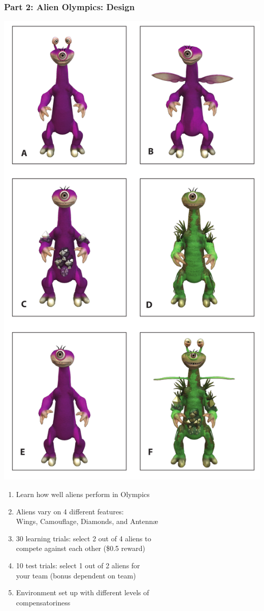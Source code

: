 \documentclass{beamer}
\begin{document}
\begin{frame}
    \frametitle{Part 2: Alien Olympics:  Design}
\hfill \includegraphics[scale=0.14]{aliens.png}\vspace{-5cm}
\begin{enumerate}
\item Learn how well aliens perform in Olympics
\item Aliens vary on 4 different features:\\
Wings, Camouflage, Diamonds, and Antenn\ae
\item 30 learning trials: select 2 out of 4 aliens to\\
compete against each other (\$0.5 reward)
\item 10 test trials: select 1 out of 2 aliens for\\ your team (bonus dependent on team)
\item Environment set up with different levels of\\
compensatoriness
\end{enumerate}
\end{frame}
\end{document}
